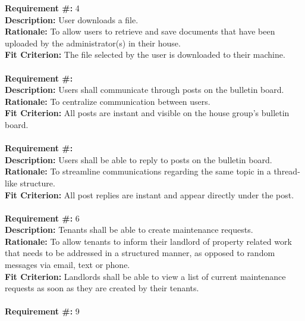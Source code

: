 \documentclass[12pt]{article}
\begin{document}
\textbf{Requirement \#:} 4
       \\
      \textbf{Description:} User downloads a file. \\
      \textbf{Rationale:} To allow users to retrieve and save documents that 
have
      been uploaded by the administrator(s) in their house. \\
      \textbf{Fit Criterion:} The file selected by the user is downloaded to
      their machine. \\ \\
\textbf{Requirement \#:} 
       \\
      \textbf{Description:} Users shall communicate through posts on the bulletin board. \\
      \textbf{Rationale:} To centralize communication between users. \\
      \textbf{Fit Criterion:} All posts are instant and visible on the house group's bulletin board.  \\ \\ 
      \textbf{Requirement \#:} 
       \\
      \textbf{Description:} Users shall be able to reply to posts on the bulletin board. \\
      \textbf{Rationale:} To streamline communications regarding the same topic in a thread-like structure. \\
      \textbf{Fit Criterion:} All post replies are instant and appear directly under the post.  \\ \\ 
\textbf{Requirement \#:} 6
       \\
      \textbf{Description:} Tenants shall be able to create maintenance
      requests. \\
      \textbf{Rationale:} To allow tenants to inform their landlord of property
      related work that needs to be addressed in a structured manner, as opposed to random messages via email, text or phone.\\
      \textbf{Fit Criterion:} Landlords shall be able to view a list of current
      maintenance requests as soon as they are created by their tenants.\\ \\          
\textbf{Requirement \#:} 9
\end{document}
